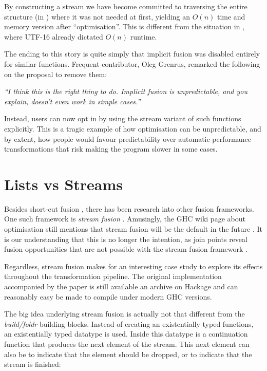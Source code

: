 By constructing a stream we have become committed to traversing the entire structure (in ) where it was not needed at first,
yielding an $O(n)$ time and memory version after ``optimisation''. This is different from the situation in ,
where UTF-16 already dictated $O(n)$ runtime.

The ending to this story is quite simply that implicit fusion was disabled entirely \cite{two_tails} for similar functions.
Frequent  contributor, Oleg Grenrus, remarked the following on the proposal to remove them:

\textit{``I think this is the right thing to do. Implicit fusion is unpredictable, and you explain, doesn't even work in simple cases.''}

Instead, users can now opt in by using the stream variant of such functions explicitly. This is a tragic example of how optimisation
can be unpredictable, and by extent, how people would favour predictability over automatic performance transformations that
risk making the program slower in some cases.

\section{Lists vs Streams}

Besides short-cut fusion \cite{shortcut_fusion}, there has been research into other fusion frameworks. One such framework is \textit{stream fusion} \cite{stream_fusion}.
Amusingly, the GHC wiki page about optimisation still mentions that stream fusion will be the default in the future \cite{ghc_wiki_opt}. It is our understanding
that this is no longer the intention, as join points reveal fusion opportunities that are not possible with the stream fusion framework \cite{compiling_wo_continuations}.

Regardless, stream fusion makes for an interesting case study to explore its effects throughout the transformation pipeline. The original implementation accompanied by
the paper is still available an archive on Hackage and can reasonably easy be made to compile under modern GHC versions.

The big idea underlying stream fusion is actually not that different from the \textit{build/foldr} building blocks. Instead of creating an existentially typed
 functions, an existentially typed datatype is used. Inside this datatype is a continuation function that produces the next element of the stream.
This next element can also be  to indicate that the element should be dropped, or  to indicate that the stream is finished:

